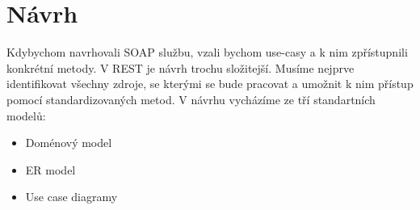 \chapter{Návrh}

Kdybychom navrhovali SOAP službu, vzali bychom use-casy a k nim zpřístupnili konkrétní metody. V REST je návrh trochu složitejší.
Musíme nejprve identifikovat všechny zdroje, se kterými se bude pracovat a umožnit k nim přístup pomocí standardizovaných metod.
V návrhu vycházíme ze tří standartních modelů:

\begin{itemize}
\item Doménový model
\item ER model
\item Use case diagramy
\end{itemize}